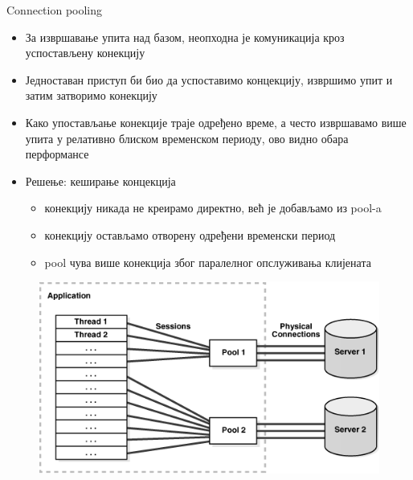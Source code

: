 \documentclass[aspectratio=169]{beamer}
\begin{document}
    \begin{frame}[allowframebreaks]{Connection pooling}
        \begin{itemize}
            \item За извршавање упита над базом, неопходна је комуникација кроз успостављену конекцију
            \item Једноставан приступ би био да успоставимо концекцију, извршимо упит и затим затворимо конекцију
            \item Како упостављање конекције траје одређено време, а често извршавамо више упита у релативно блиском временском периоду, ово видно обара перформансе
            \item Решење: кеширање концекција
            \begin{itemize}
                \item конекцију никада не креирамо директно, већ је добављамо из pool-a
                \item конекцију остављамо отворену одређени временски период
                \item pool чува више конекција због паралелног опслуживања клијената
            \end{itemize} 
        \end{itemize}
        
        \framebreak
        
        \begin{figure}
            \centering
            \includegraphics[width=\textwidth,height=\textheight,keepaspectratio]{images/connpool.png}
            \label{fig:connpool}
        \end{figure}
    \end{frame}
    
\end{document}
